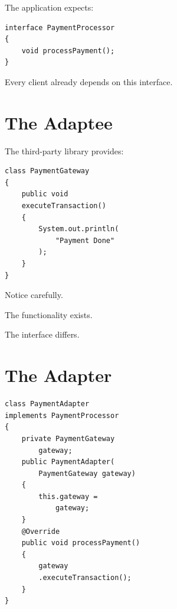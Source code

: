 \documentclass[11pt,a4paper]{book}
\begin{document}
The application expects:

\begin{verbatim}
interface PaymentProcessor
{
    void processPayment();
}
\end{verbatim}


Every client already depends
on this interface.


\section{The Adaptee}

The third-party library provides:

\begin{verbatim}
class PaymentGateway
{
    public void
    executeTransaction()
    {
        System.out.println(
            "Payment Done"
        );
    }
}
\end{verbatim}


Notice carefully.


The functionality exists.


The interface differs.


\section{The Adapter}

\begin{verbatim}
class PaymentAdapter
implements PaymentProcessor
{
    private PaymentGateway
        gateway;
    public PaymentAdapter(
        PaymentGateway gateway)
    {
        this.gateway =
            gateway;
    }
    @Override
    public void processPayment()
    {
        gateway
        .executeTransaction();
    }
}
\end{verbatim}
\end{document}
